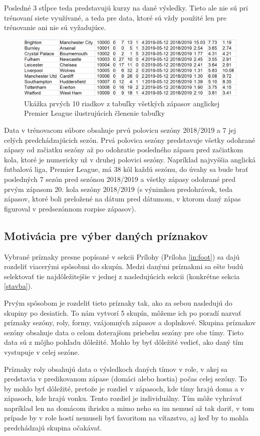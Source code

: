 Posledné 3 stĺpce teda predstavujú kurzy na dané výsledky. Tieto ale nie sú pri trénovaní siete využívané, a teda pre data, ktoré sú vždy použité len pre trénovanie ani nie sú vyžadujúce.

\noindent
\begin{figure}[b]
\includegraphics[width=\textwidth]{../img/eng.png}
\caption{Ukážka prvých 10 riadkov z tabuľky všetkých zápasov anglickej Premier League ilustrujúcich členenie tabuľky}
\end{figure}
Data v trénovacom súbore obsahuje prvú polovicu sezóny 2018/2019 a 7 jej celých predchádzajúcich sezón. Prvá polovica sezóny predstavuje všetky odohrané zápasy od začiatku sezóny až po odohratie posledného zápasu pred začiatkom kola, ktoré je numericky už v druhej polovici sezóny. 
Napríklad najvyššia anglická futbalová liga, Premier League, má 38 kôl každú sezónu, do úvahy sa bude brať posledných 7 sezón pred sezónou 2018/2019 a všetky zápasy odohrané pred prvým zápasom 20. kola sezóny 2018/2019 (s výnimkou predohrávok, teda zápasov, ktoré boli preložené na dátum pred dátumom, v ktorom daný zápas figuroval v predsezónnom rozpise zápasov).


\subsection{Motivácia pre výber daných príznakov}
Vybrané príznaky presne popísané v sekcii Prílohy (Príloha \ref{in:foot}) sa dajú rozdeliť viacerými spôsobmi do skupín.
Medzi danými príznakmi sa ešte budú selektovať tie najdôležitejšie v jednej z nasledujúcich sekcii (konkrétne sekcia \ref{stavba}).

Prvým spôsobom je rozdeliť tieto príznaky tak, ako za sebou nasledujú do skupiny po desiatich. To nám vytvorí 5 skupín, môžeme ich po poradí nazvať príznaky sezóny, roly, formy, vzájomných zápasov a doplnkové.
Skupina príznakov sezóny obsahuje data o celom doterajšom priebehu sezóny pre obe tímy. Tieto data sú z môjho pohľadu dôležité. Mohlo by byť dôležité vedieť, ako daný tím vystupuje v celej sezóne.

Príznaky roly obsahujú data o výsledkoch daných tímov v role, v akej sa predstavia v predikovanom zápase (domáci alebo hostia) počas celej sezóny. To by mohlo byť dôležité, pretože je rozdiel v zápasoch, kde tímy hrajú doma a v zápasoch, kde hrajú vonku. Tento rozdiel je individuálny. Tím môže vyhrávať napríklad len na domácom ihrisku a mimo neho sa im nemusí až tak dariť, v tom prípade by v role hostí nemuseli byť favoritom na víťazstvo, aj keď by to mohla predchádzajú skupina očakávať.


